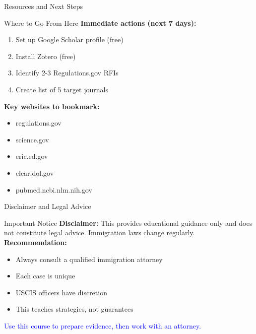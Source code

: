 \documentclass[11pt]{beamer}
\begin{document}
	\begin{frame}{Resources and Next Steps}
		\small
		\begin{block}{Where to Go From Here}
			\textbf{Immediate actions (next 7 days):}
			\begin{enumerate}
				\item Set up Google Scholar profile (free)
				\item Install Zotero (free)
				\item Identify 2-3 Regulations.gov RFIs
				\item Create list of 5 target journals
			\end{enumerate}
			\textbf{Key websites to bookmark:}
			\begin{itemize}
				\item regulations.gov
				\item science.gov
				\item eric.ed.gov
				\item clear.dol.gov
				\item pubmed.ncbi.nlm.nih.gov
			\end{itemize}
		\end{block}
	\end{frame}
	
	\begin{frame}{Disclaimer and Legal Advice}
		\small
		\begin{block}{Important Notice}
			\textbf{Disclaimer:} This provides educational guidance only and does not constitute legal advice. Immigration laws change regularly.
			\vspace{0.2cm}
			\textbf{Recommendation:}
			\begin{itemize}
				\item Always consult a qualified immigration attorney
				\item Each case is unique
				\item USCIS officers have discretion
				\item This teaches strategies, not guarantees
			\end{itemize}
			\textcolor{blue}{Use this course to prepare evidence, then work with an attorney.}
		\end{block}
	\end{frame}
	
\end{document}
